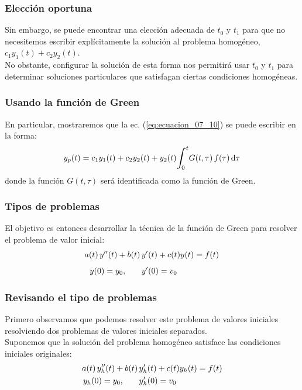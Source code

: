 \documentclass[12pt]{beamer}
\begin{document}
\begin{frame}
\frametitle{Elección oportuna}
Sin embargo, se puede encontrar una elección adecuada de $t_{0}$ y $t_{1}$ para que no necesitemos escribir explícitamente la solución al problema homogéneo, $c_{1} y_{1} (t) + c_{2} y_{2} (t)$. 
\\
\bigskip
\pause
No obstante, configurar la solución de esta forma nos permitirá usar $t_{0}$ y $t_{1}$ para determinar soluciones particulares que satisfagan ciertas condiciones homogéneas.
\end{frame}

\begin{frame}
\frametitle{Usando la función de Green}
En particular, mostraremos que la ec. (\ref{eq:ecuacion_07_10}) se puede escribir en la forma:
\pause
\begin{align}
y_{p} (t) = c_{1} y_{1} (t) + c_{2} y_{2} (t) +  y_{2} (t) \scaleint{6ex}_{\bs 0}^{t} G (t,\tau) \, f (\tau) \dd{\tau}
\label{eq:ecuacion_07_11}
\end{align}
donde la función $G (t, \tau)$ será identificada como la función de Green.
\end{frame}

\begin{frame}
\frametitle{Tipos de problemas}
El objetivo es entonces desarrollar la técnica de la función de Green para resolver el problema de valor inicial:
\pause
\begin{eqnarray}
\begin{aligned}
a (t) \, {y}^{\prime \prime} (t) + b (t) \, &{y}^{\prime} (t) + c (t) y(t) = f (t) \\[0.5em]
y (0) = y_{0}, \hspace{0.7cm} &{y}^{\prime} (0) = v_{0}
\end{aligned}
\label{eq:ecuacion_07_12}
\end{eqnarray}
\end{frame}

\begin{frame}
\frametitle{Revisando el tipo de problemas}
Primero observamos que podemos resolver este problema de valores iniciales resolviendo dos problemas de valores iniciales separados.
\\
\bigskip
\pause
Suponemos que la solución del problema homogéneo satisface las condiciones iniciales originales:
\pause
\begin{eqnarray}
\begin{aligned}
a (t) \, {y}^{\prime \prime}_{h} (t) + b (t) \, &{y}^{\prime}_{h} (t) + c (t) y_{h} (t) = f (t) \\
y_{h} (0) = y_{0}, \hspace{0.7cm} &{y}^{\prime}_{h} (0) = v_{0}
\end{aligned}
\label{eq:ecuacion_07_13}
\end{eqnarray}
\end{frame}
\end{document}
